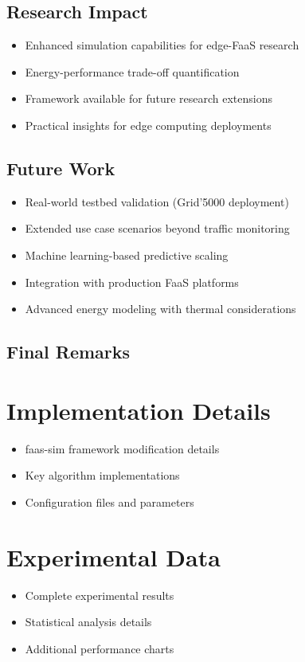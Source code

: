 \documentclass[12pt,a4paper]{report}
\begin{document}
\section{Research Impact}
\begin{itemize}[leftmargin=1cm]
    \item Enhanced simulation capabilities for edge-FaaS research
    \item Energy-performance trade-off quantification
    \item Framework available for future research extensions
    \item Practical insights for edge computing deployments
\end{itemize}

\section{Future Work}
\begin{itemize}[leftmargin=1cm]
    \item Real-world testbed validation (Grid'5000 deployment)
    \item Extended use case scenarios beyond traffic monitoring
    \item Machine learning-based predictive scaling
    \item Integration with production FaaS platforms
    \item Advanced energy modeling with thermal considerations
\end{itemize}

\section{Final Remarks}


\appendix

\chapter{Implementation Details}
\begin{itemize}[leftmargin=1cm]
    \item faas-sim framework modification details
    \item Key algorithm implementations
    \item Configuration files and parameters
\end{itemize}

\chapter{Experimental Data}
\begin{itemize}[leftmargin=1cm]
    \item Complete experimental results
    \item Statistical analysis details
    \item Additional performance charts
\end{itemize}
\end{document}
